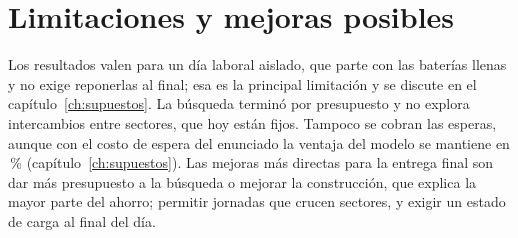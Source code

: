 \section{Limitaciones y mejoras posibles}
\label{sec:limitaciones-resultados}

Los resultados valen para un día laboral aislado, que parte con las baterías llenas y no exige reponerlas al final; esa es la principal limitación y se discute en el capítulo~\ref{ch:supuestos}. La búsqueda terminó por presupuesto y no explora intercambios entre sectores, que hoy están fijos. Tampoco se cobran las esperas, aunque con el costo de espera del enunciado la ventaja del modelo se mantiene en \DeltaPctCostoConEspera\,\% (capítulo~\ref{ch:supuestos}). Las mejoras más directas para la entrega final son dar más presupuesto a la búsqueda o mejorar la construcción, que explica la mayor parte del ahorro; permitir jornadas que crucen sectores, y exigir un estado de carga al final del día.
